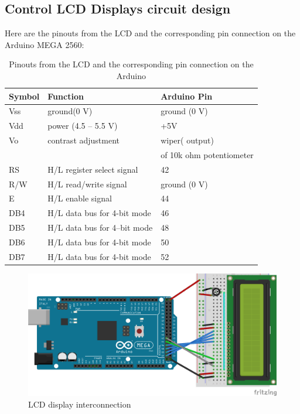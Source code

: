 \subsection{Control LCD Displays circuit design}
Here are the pinouts from the LCD and the corresponding pin connection on the Arduino MEGA 2560:
\begin{table}[H]
	\centering
	\caption{Pinouts from the LCD and the corresponding pin connection on the Arduino}	
	\label{tab:LCD_connectto_Arduino}
	\begin{tabularx}{0.65\textwidth}{lll}
		\toprule
		\textbf{Symbol} & \textbf{Function} & \textbf{Arduino Pin} 	\\
		\midrule
		Vss & ground(0 V) & ground (0 V) 							\\
		\midrule
		Vdd & power (4.5 – 5.5 V) & +5V 							\\
		\midrule
		Vo & contrast adjustment & wiper( output) 					\\
		& & of 10k ohm potentiometer 								\\
		\midrule
		RS & H/L register select signal & 42 						\\
		\midrule
		R/W	& H/L read/write signal & ground (0 V) 					\\
		\midrule
		E & H/L enable signal	& 44 								\\
		\midrule
		DB4	& H/L data bus for 4-bit mode & 46 						\\
		\midrule
		DB5	& H/L data bus for 4--bit mode & 48 					\\
		\midrule
		DB6	& H/L data bus for 4-bit mode & 50 						\\
		\midrule
		DB7	& H/L data bus for 4-bit mode & 52 						\\
		\bottomrule
	\end{tabularx}
\end{table}

\begin{figure}[H]
	\centering
	\includegraphics[width=\maxwidth{15cm}, keepaspectratio]{Chapters/Fig/deltarobot_LCD_16x2.png}
	\caption{LCD display interconnection}
	\label{fig:deltarobot_LCD_16x2}
\end{figure}

